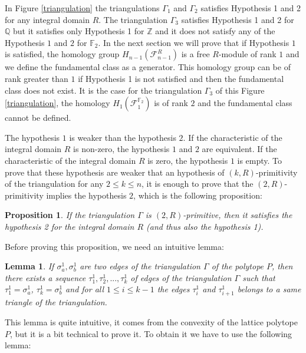\documentclass{article}
\newtheorem{lemma}{Lemma}
\newtheorem{proposition}{Proposition}
\begin{document}
In Figure \ref{triangulation} the triangulations $\Gamma_1$ and $\Gamma_2$ satisfies Hypothesis 1 and 2 for any integral domain $R$. The triangulation $\Gamma_3$ satisfies Hypothesis 1 and 2 for $\mathbb{Q}$ but it satisfies only Hypothesis 1 for $\mathbb{Z}$ and it does not satisfy any of the Hypothesis $1$ and $2$ for $\mathbb{F}_2$. In the next section we will prove that if Hypothesis $1$ is satisfied, the homology group $H_{n-1}(\mathcal{F}_{n-1}^R)$ is a free $R$-module of rank $1$ and we define the fundamental class as a generator. This homology group can be of rank greater than $1$ if Hypothesis 1 is not satisfied and then the fundamental class does not exist. It is the case for the triangulation $\Gamma_3$ of this Figure \ref{triangulation}, the homology $H_{1}(\mathcal{F}_{1}^{\mathbb{F}_2})$ is of rank $2$ and the fundamental class cannot be defined.

The hypothesis $1$ is weaker than the hypothesis $2$. If the characteristic of the integral domain $R$ is non-zero, the hypothesis $1$ and $2$ are equivalent. If the characteristic of the integral domain $R$ is zero, the hypothesis $1$ is empty. To prove that these hypothesis are weaker that an hypothesis of $(k,R)$-primitivity of the triangulation for any $2\leq k \leq n$, it is enough to prove that the $(2,R)$-primitivity implies the hypothesis $2$, which is the following proposition:

\begin{proposition}
    If the triangulation $\Gamma$ is $(2,R)$-primitive, then it satisfies the hypothesis 2 for the integral domain $R$ (and thus also the hypothesis 1).
    \label{jt}
\end{proposition}

Before proving this proposition, we need an intuitive lemma:

\begin{lemma}
    If $\sigma^1_a,\sigma^1_b$ are two edges of the triangulation $\Gamma$ of the polytope $P$, then there exists a sequence $\tau^1_1,\tau^1_2,...,\tau^1_k$ of edges of the triangulation $\Gamma$ such that $\tau^1_1=\sigma^1_a$, $\tau^1_k=\sigma^1_b$ and for all $1\leq i \leq k-1$ the edges $\tau^1_i$ and $\tau^1_{i+1}$ belongs to a same triangle of the triangulation.
    \label{br}
\end{lemma}

This lemma is quite intuitive, it comes from the convexity of the lattice polytope $P$, but it is a bit technical to prove it. To obtain it we have to use the following lemma:
\end{document}

